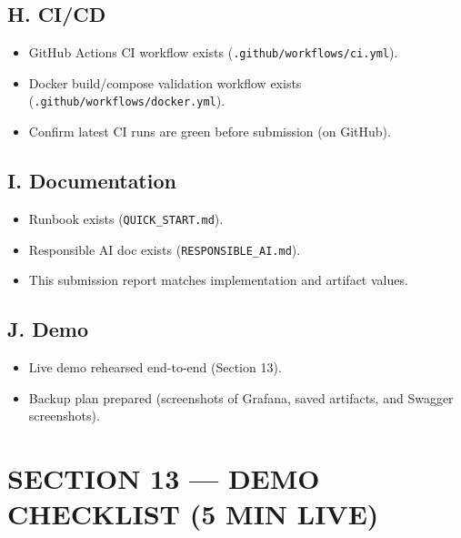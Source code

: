 \documentclass[11pt]{article}
\newcommand{\code}[1]{\texttt{#1}}
\newcommand{\checked}{\texttt{[x]}}
\newcommand{\unchecked}{\texttt{[ ]}}
\begin{document}
\subsection*{H. CI/CD}
\begin{itemize}
  \item[\checked] GitHub Actions CI workflow exists (\code{.github/workflows/ci.yml}).
  \item[\checked] Docker build/compose validation workflow exists (\code{.github/workflows/docker.yml}).
  \item[\unchecked] Confirm latest CI runs are green before submission (on GitHub).
\end{itemize}

\subsection*{I. Documentation}
\begin{itemize}
  \item[\checked] Runbook exists (\code{QUICK\_START.md}).
  \item[\checked] Responsible AI doc exists (\code{RESPONSIBLE\_AI.md}).
  \item[\checked] This submission report matches implementation and artifact values.
\end{itemize}

\subsection*{J. Demo}
\begin{itemize}
  \item[\unchecked] Live demo rehearsed end-to-end (Section 13).
  \item[\unchecked] Backup plan prepared (screenshots of Grafana, saved artifacts, and Swagger screenshots).
\end{itemize}

\section*{SECTION 13 — DEMO CHECKLIST (5 MIN LIVE)}
\end{document}
